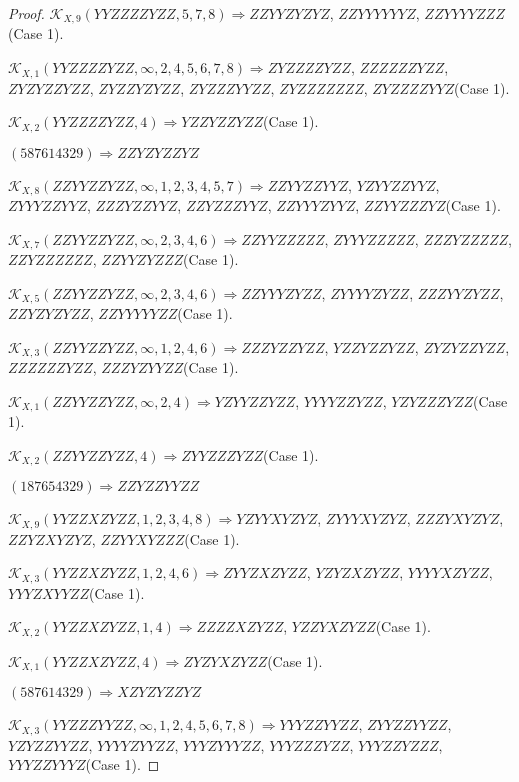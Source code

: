 \documentclass[12pt]{article}
\theoremstyle{plain}
\theoremstyle{definition}
\theoremstyle{remark}
\newcommand{\fancy}[1]{\mathcal{#1}}
\def\K{\fancy{K}}
\begin{document}
\begin{proof}
	$\K_{X,9}(YYZZZZYZZ,5, 7, 8)\Rightarrow $$ZZYYZYZYZ$, $ZZYYYYYYZ$, $ZZYYYYZZZ$(Case 1).
	
	$\K_{X,1}(YYZZZZYZZ,\infty,2, 4, 5, 6, 7, 8)\Rightarrow $$ZYZZZZYZZ$, $ZZZZZZYZZ$, $ZYZYZZYZZ$, $ZYZZYZYZZ$, $ZYZZZYYZZ$, $ZYZZZZZZZ$, $ZYZZZZYYZ$(Case 1).
	
	$\K_{X,2}(YYZZZZYZZ,4)\Rightarrow $$YZZYZZYZZ$(Case 1).
	
	
	
	$(5 8 7 6 1 4 3 2 9)\Rightarrow ZZYZYZZYZ$
	
	
	
	$\K_{X,8}(ZZYYZZYZZ,\infty,1, 2, 3, 4, 5, 7)\Rightarrow $$ZZYYZZYYZ$, $YZYYZZYYZ$, $ZYYYZZYYZ$, $ZZZYZZYYZ$, $ZZYZZZYYZ$, $ZZYYYZYYZ$, $ZZYYZZZYZ$(Case 1).
	
	$\K_{X,7}(ZZYYZZYZZ,\infty,2, 3, 4, 6)\Rightarrow $$ZZYYZZZZZ$, $ZYYYZZZZZ$, $ZZZYZZZZZ$, $ZZYZZZZZZ$, $ZZYYZYZZZ$(Case 1).
	
	$\K_{X,5}(ZZYYZZYZZ,\infty,2, 3, 4, 6)\Rightarrow $$ZZYYYZYZZ$, $ZYYYYZYZZ$, $ZZZYYZYZZ$, $ZZYZYZYZZ$, $ZZYYYYYZZ$(Case 1).
	
	$\K_{X,3}(ZZYYZZYZZ,\infty,1, 2, 4, 6)\Rightarrow $$ZZZYZZYZZ$, $YZZYZZYZZ$, $ZYZYZZYZZ$, $ZZZZZZYZZ$, $ZZZYZYYZZ$(Case 1).
	
	$\K_{X,1}(ZZYYZZYZZ,\infty,2, 4)\Rightarrow $$YZYYZZYZZ$, $YYYYZZYZZ$, $YZYZZZYZZ$(Case 1).
	
	$\K_{X,2}(ZZYYZZYZZ,4)\Rightarrow $$ZYYZZZYZZ$(Case 1).
	
	
	
	$(1 8 7 6 5 4 3 2 9)\Rightarrow ZZYZZYYZZ$
	
	
	
	$\K_{X,9}(YYZZXZYZZ,1, 2, 3, 4, 8)\Rightarrow $$YZYYXYZYZ$, $ZYYYXYZYZ$, $ZZZYXYZYZ$, $ZZYZXYZYZ$, $ZZYYXYZZZ$(Case 1).
	
	$\K_{X,3}(YYZZXZYZZ,1, 2, 4, 6)\Rightarrow $$ZYYZXZYZZ$, $YZYZXZYZZ$, $YYYYXZYZZ$, $YYYZXYYZZ$(Case 1).
	
	$\K_{X,2}(YYZZXZYZZ,1, 4)\Rightarrow $$ZZZZXZYZZ$, $YZZYXZYZZ$(Case 1).
	
	$\K_{X,1}(YYZZXZYZZ,4)\Rightarrow $$ZYZYXZYZZ$(Case 1).
	
	
	
	$(5 8 7 6 1 4 3 2 9)\Rightarrow XZYZYZZYZ$
	
	
	
	$\K_{X,3}(YYZZZYYZZ,\infty,1, 2, 4, 5, 6, 7, 8)\Rightarrow $$YYYZZYYZZ$, $ZYYZZYYZZ$, $YZYZZYYZZ$, $YYYYZYYZZ$, $YYYZYYYZZ$, $YYYZZZYZZ$, $YYYZZYZZZ$, $YYYZZYYYZ$(Case 1).
	

\end{proof}
\end{document}
